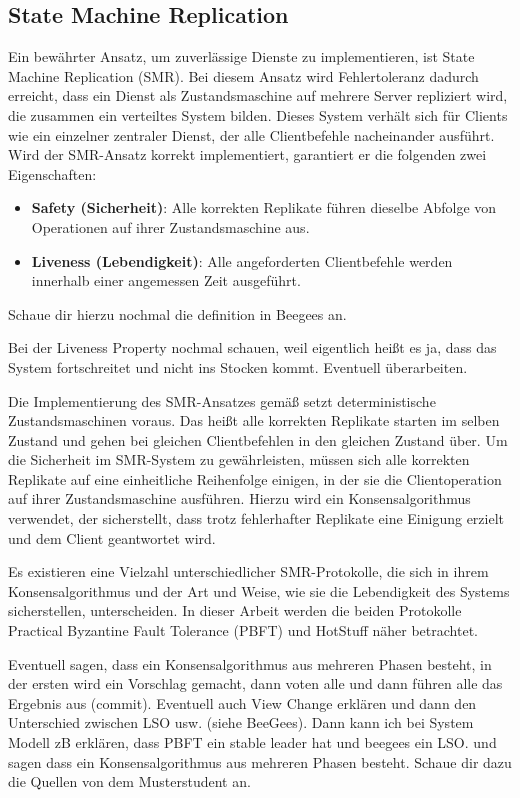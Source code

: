 \documentclass[nonacm,sigconf,natbib=false]{acmart}
\begin{document}
\subsection{State Machine Replication}

Ein bewährter Ansatz, um zuverlässige Dienste zu implementieren, ist State Machine Replication (SMR)\cite{smr-lamport}\cite{smr-schneider}. Bei diesem Ansatz wird Fehlertoleranz dadurch erreicht, dass ein Dienst als Zustandsmaschine auf mehrere Server repliziert wird, die zusammen ein verteiltes System bilden. Dieses System verhält sich für Clients wie ein einzelner zentraler Dienst, der alle Clientbefehle nacheinander ausführt. Wird der SMR-Ansatz korrekt implementiert, garantiert er die folgenden zwei Eigenschaften:
\begin{itemize}
  \item \textbf{Safety (Sicherheit)}: Alle korrekten Replikate führen dieselbe Abfolge von Operationen auf ihrer Zustandsmaschine aus.
  \item \textbf{Liveness (Lebendigkeit)}: Alle angeforderten Clientbefehle werden innerhalb einer angemessen Zeit ausgeführt.
\end{itemize}
Schaue dir hierzu nochmal die definition in Beegees an.

Bei der Liveness Property nochmal schauen, weil eigentlich heißt es ja, dass das System fortschreitet und nicht ins Stocken kommt. Eventuell überarbeiten.

Die Implementierung des SMR-Ansatzes gemäß \cite{smr-schneider} setzt deterministische Zustandsmaschinen voraus. Das heißt alle korrekten Replikate starten im selben Zustand und gehen bei gleichen Clientbefehlen in den gleichen Zustand über. Um die Sicherheit im SMR-System zu gewährleisten, müssen sich alle korrekten Replikate auf eine einheitliche Reihenfolge einigen, in der sie die Clientoperation auf ihrer Zustandsmaschine ausführen. Hierzu wird ein Konsensalgorithmus verwendet, der sicherstellt, dass trotz fehlerhafter Replikate eine Einigung erzielt und dem Client geantwortet wird.

Es existieren eine Vielzahl unterschiedlicher SMR-Protokolle, die sich in ihrem Konsensalgorithmus und der Art und Weise, wie sie die Lebendigkeit des Systems sicherstellen, unterscheiden. In dieser Arbeit werden die beiden Protokolle Practical Byzantine Fault Tolerance (PBFT)\cite{pbft} und HotStuff\cite{hotstuff} näher betrachtet.

Eventuell sagen, dass ein Konsensalgorithmus aus mehreren Phasen besteht, in der ersten wird ein Vorschlag gemacht, dann voten alle und dann führen alle das Ergebnis aus (commit). Eventuell auch View Change erklären und dann den Unterschied zwischen LSO usw. (siehe BeeGees). Dann kann ich bei System Modell zB erklären, dass PBFT ein stable leader hat und beegees ein LSO. und sagen dass ein Konsensalgorithmus aus mehreren Phasen besteht. Schaue dir dazu die Quellen von dem Musterstudent an.
\end{document}
